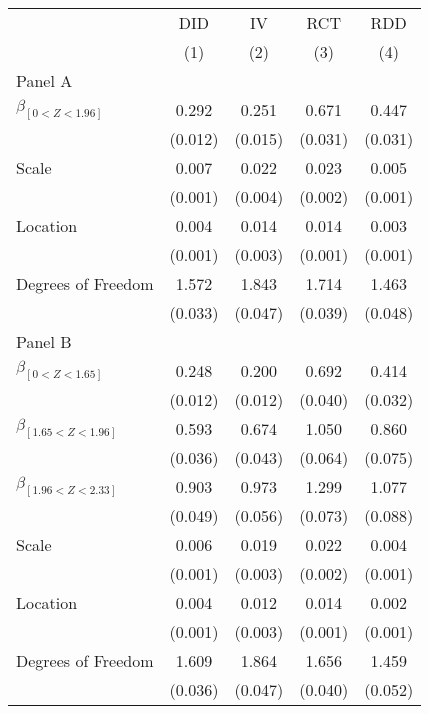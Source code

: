 \def\sym#1{\ifmmode^{#1}\else\(^{#1}\)\fi}
\begin{tabular}{l*{4}{c}}
\hline\hline
& \multicolumn{1}{c}{DID} &  \multicolumn{1}{c}{IV} &  \multicolumn{1}{c}{RCT} &  \multicolumn{1}{c}{RDD}\\

& \multicolumn{1}{c}{(1)} &  \multicolumn{1}{c}{(2)} &  \multicolumn{1}{c}{(3)} &  \multicolumn{1}{c}{(4)}\\

\hline
\hline

Panel A \\

$\beta_{[0 < Z < 1.96]}$ & 0.292 &  0.251 &  0.671 &  0.447\\
& (0.012) &  (0.015) &  (0.031) &  (0.031)\\

Scale & 0.007 &  0.022 &  0.023 &  0.005\\
& (0.001) &  (0.004) &  (0.002) &  (0.001)
\\

Location & 0.004 &  0.014 &  0.014 &  0.003\\
& (0.001) &  (0.003) &  (0.001) &  (0.001)
\\

Degrees of Freedom & 1.572 &  1.843 &  1.714 &  1.463\\
& (0.033) &  (0.047) &  (0.039) &  (0.048)\\
Panel B \\

$\beta_{[0 < Z < 1.65]}$ & 0.248 &  0.200 &  0.692 &  0.414\\
& (0.012) &  (0.012) &  (0.040) &  (0.032)\\

$\beta_{[1.65 < Z < 1.96]}$ & 0.593 &  0.674 &  1.050 &  0.860\\
& (0.036) &  (0.043) &  (0.064) &  (0.075)\\


$\beta_{[1.96 < Z < 2.33]}$ & 0.903 &  0.973 &  1.299 &  1.077\\
& (0.049) &  (0.056) &  (0.073) &  (0.088)\\

Scale & 0.006 &  0.019 &  0.022 &  0.004\\
& (0.001) &  (0.003) &  (0.002) &  (0.001)
\\

Location & 0.004 &  0.012 &  0.014 &  0.002\\
& (0.001) &  (0.003) &  (0.001) &  (0.001)
\\

Degrees of Freedom & 1.609 &  1.864 &  1.656 &  1.459\\
& (0.036) &  (0.047) &  (0.040) &  (0.052)\\

\hline\hline
\end{tabular}

